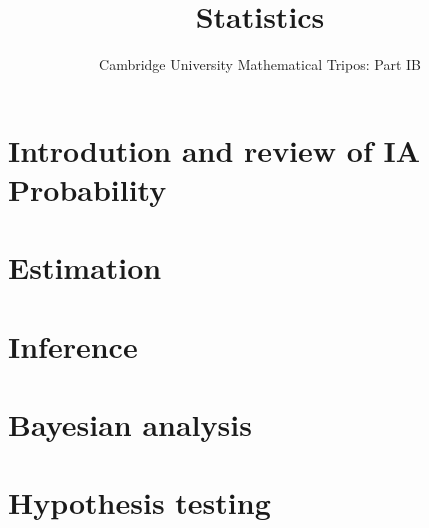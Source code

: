 \documentclass{article}
\title{Statistics}
\author{Cambridge University Mathematical Tripos: Part IB}
\begin{document}
\maketitle

\tableofcontentsnewpage{}

\section{Introdution and review of IA Probability}

\section{Estimation}

\section{Inference}

\section{Bayesian analysis}

\section{Hypothesis testing}

\end{document}
